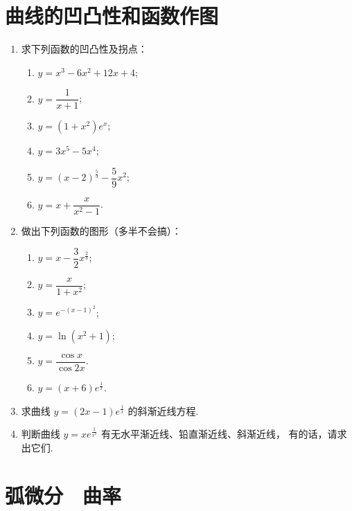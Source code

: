 \section{曲线的凹凸性和函数作图}

\begin{enumerate}\setlength{\itemsep}{7pt}
    \item 求下列函数的凹凸性及拐点：
    \begin{enumerate}[(1)]\setlength{\itemsep}{5pt}\setlength{\topsep}{15pt}
        \item $y=x^3-6x^2+12x+4$;
        \item $y=\dfrac{1}{x+1}$;
        \item $y=(1+x^2)e^x$;
        \item $y=3x^5-5x^4$;
        \item $y=(x-2)^{\frac{5}{3}}-\dfrac{5}{9}x^2$;
        \item $y=x+\dfrac{x}{x^2-1}$.
    \end{enumerate}

    \item 做出下列函数的图形（多半不会搞）：
    \begin{enumerate}[(1)]\setlength{\itemsep}{5pt}\setlength{\topsep}{15pt}
        \item $y=x-\dfrac{3}{2}x^{\frac{2}{3}}$;
        \item $y=\dfrac{x}{1+x^2}$;
        \item $y=e^{-(x-1)^2}$;
        \item $y=\ln(x^2+1)$;
        \item $y=\dfrac{\cos x}{\cos 2x}$.
        \item $y=(x+6)e^{\frac{1}{x}}$.
    \end{enumerate}

    \item 求曲线 $y=(2x-1)e^{\frac{1}{x}}$ 的斜渐近线方程.
    
    \item 判断曲线 $y=xe^{\frac{1}{x^2}}$ 有无水平渐近线、铅直渐近线、斜渐近线，
    有的话，请求出它们.


\end{enumerate}

\section{弧微分$\quad$曲率}

